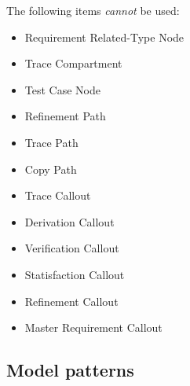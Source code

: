 The following items \emph{cannot} be used:
\begin{itemize}
\item Requirement Related-Type Node
\item Trace Compartment
\item Test Case Node
\item Refinement Path
\item Trace Path
\item Copy Path
\item Trace Callout
\item Derivation Callout
\item Verification Callout
\item Statisfaction Callout
\item Refinement Callout
\item Master Requirement Callout
\end{itemize}



\subsection{Model patterns}



\begin{comment}
Example of patterns to use.

\end{comment}

